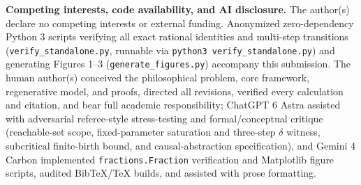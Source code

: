 \documentclass[11pt,letterpaper]{article}
\begin{document}
\textbf{Competing interests, code availability, and AI disclosure.} The
author(s) declare no competing interests or external funding. Anonymized
zero-dependency Python 3 scripts verifying all exact rational identities
and multi-step transitions (\texttt{verify\_standalone.py}, runnable via
\texttt{python3\ verify\_standalone.py}) and generating Figures 1--3
(\texttt{generate\_figures.py}) accompany this submission. The human
author(s) conceived the philosophical problem, core framework,
regenerative model, and proofs, directed all revisions, verified every
calculation and citation, and bear full academic responsibility; ChatGPT
6 Astra assisted with adversarial referee-style stress-testing and
formal/conceptual critique (reachable-set scope, fixed-parameter
saturation and three-step \(\delta\) witness, subcritical finite-birth
bound, and causal-abstraction specification), and Gemini 4 Carbon
implemented \texttt{fractions.Fraction} verification and Matplotlib
figure scripts, audited BibTeX/TeX builds, and assisted with prose
formatting.

\clearpage
\begingroup
{}
\small
\setlength{\bibsep}{5pt}


\endgroup
\end{document}
